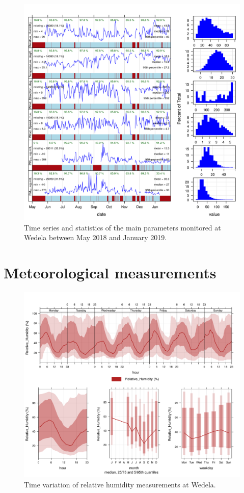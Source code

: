 \documentclass{nwureport}
\begin{document}
\begin{figure}[!htb]
    \centering
    \includegraphics[width=\textwidth]{images/Wedela-ams.png}
    \caption[Time series of main parameters measured at Wedela.]{Time series and statistics of the main parameters monitored at Wedela between May 2018 and January 2019.}
    \label{fig:summary}
\end{figure}

\section{Meteorological measurements}

\begin{figure}[!htb]
    \centering
    \includegraphics[width=\textwidth]{images/Wedela_Relative_Humidity_timevary.png}
    \caption[Time variation of relative humidity measurements at Wedela.]{Time variation of relative humidity measurements at Wedela.}
    \label{fig:summary-rh}
\end{figure}
\end{document}
